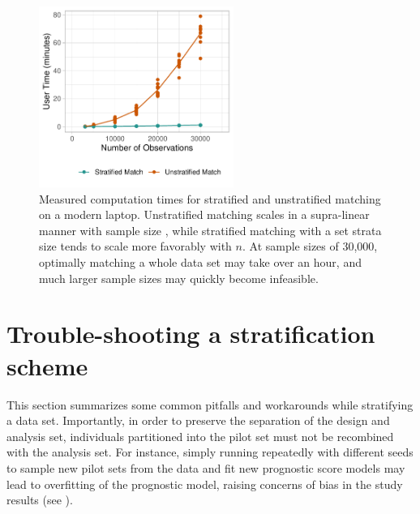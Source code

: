 \begin{figure}[htbp]
\centering
    \includegraphics[width = 2.5in]{Figure5}
    \caption{Measured computation times for stratified and unstratified matching on a modern laptop. Unstratified matching scales in a supra-linear manner with sample size \citep{hansen2006optmatch}, while stratified matching with a set strata size tends to scale more favorably with $n$. At sample sizes of  30,000, optimally matching a whole data set may take over an hour, and much larger sample sizes may quickly become infeasible.}
    \label{fig:performance}
\end{figure}

\section{Trouble-shooting a stratification scheme} \label{sec:troubleshooting}

This section summarizes some common pitfalls and workarounds while stratifying a data set.  Importantly, in order to preserve the separation of the design and analysis set, individuals partitioned into the pilot set must not be recombined with the analysis set.  For instance, simply running  repeatedly with different seeds to sample new pilot sets from the data and fit new prognostic score models may lead to overfitting of the prognostic model, raising concerns of bias in the study results (see \citet{hansen2008prognostic, abadie2018endogenous}).

